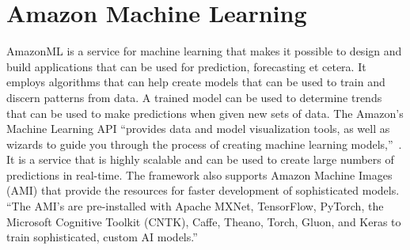 \section{Amazon Machine Learning}

AmazonML is a service for machine learning that makes it possible to design and build applications that can be used for prediction, forecasting et cetera. It employs algorithms that can help create models that can be used to train and discern patterns from data. A trained model can be used to determine trends that can be used to make predictions when given new sets of data. The Amazon's Machine Learning API ``provides data and model visualization tools, as well as wizards to guide you through the process of creating machine learning models,''~\cite{hid-sp18-512-amazonml-b}. It is a service that is highly scalable and can be used to create large numbers of predictions in real-time. The framework also supports Amazon Machine Images (AMI) that provide the resources for faster development of sophisticated models. ``The AMI's are pre-installed with Apache MXNet, TensorFlow, PyTorch, the Microsoft Cognitive Toolkit (CNTK), Caffe, Theano, Torch, Gluon, and Keras to train sophisticated, custom AI models.''~\cite{hid-sp18-512-amazonml-a}
